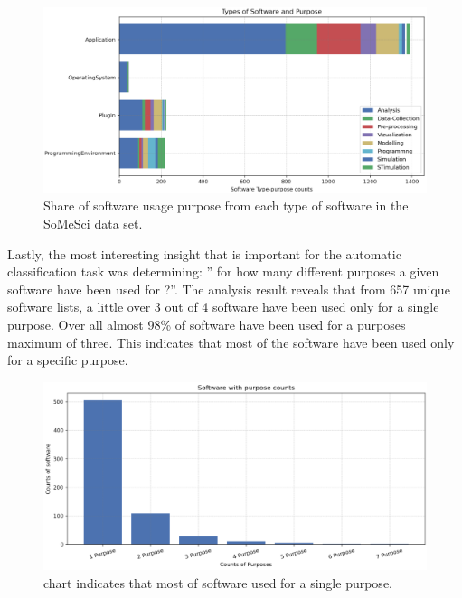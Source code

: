 \begin{figure}[htbp]
	\centering
	\includegraphics[width=1\textwidth]{4.graphics/figures/analysisresults/6.Types of Software and Purpose stacked bar}
	\caption{Share of software usage purpose from each type of software in the \ac{SoMeSci} data set.}
	\label{fig:chapter03:setup}
\end{figure}

Lastly, the most interesting insight that is important for the automatic classification task was determining: ” for how many different purposes a given software have been used for ?”.  The analysis result reveals that from 657 unique software lists, a little over 3 out of 4 software have been used only for a single purpose. Over all almost 98\% of software have been used for a purposes maximum of three. This indicates that most of the software have been used only for a specific purpose.  

\begin{figure}[htbp]
	\centering
	\includegraphics[width=1\textwidth]{4.graphics/figures/analysisresults/7.counts of software purpose}
	\caption{chart indicates that most of software used for a single purpose.}
	\label{fig:chapter03:setup}
\end{figure}

